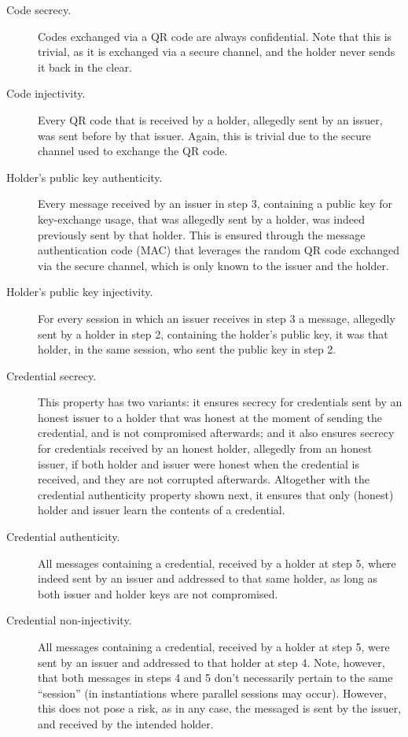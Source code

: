 \documentclass[10pt,a4paper]{article}
\begin{document}
\begin{description}
\item[Code secrecy.] Codes exchanged via a QR code are always confidential.
  Note that this is trivial, as it is exchanged via a secure channel, and
  the holder never sends it back in the clear.
\item[Code injectivity.] Every QR code that is received by a holder, allegedly
  sent by an issuer, was sent before by that issuer. Again, this is trivial due
  to the secure channel used to exchange the QR code.
\item[Holder's public key authenticity.] Every message received by an issuer
  in step 3, containing a public key for key-exchange usage, that was
  allegedly sent by a holder, was indeed previously sent by that holder.
  This is ensured through the message authentication code (MAC) that
  leverages the random QR code exchanged via the secure channel, which is
  only known to the issuer and the holder.
\item[Holder's public key injectivity.] For every session in which an
  issuer receives in step 3 a message, allegedly sent by a holder in
  step 2, containing the holder's public key, it was that holder, in
  the same session, who sent the public key in step 2.  
\item[Credential secrecy.] This property has two variants: it ensures
  secrecy for credentials sent by an honest issuer to a holder that was honest
  at the moment of sending the credential, and is not compromised afterwards;
  and it also ensures secrecy for credentials received by an honest holder,
  allegedly from an honest issuer, if both holder and issuer were honest when
  the credential is received, and they are not corrupted afterwards. Altogether
  with the credential authenticity property shown next, it ensures that only
  (honest) holder and issuer learn the contents of a credential.
\item[Credential authenticity.] All messages containing a credential, received
  by a holder at step 5, where indeed sent by an issuer and addressed to that
  same holder, as long as both issuer and holder keys are not compromised.
\item[Credential non-injectivity.] All messages containing a credential, received
  by a holder at step 5, were sent by an issuer and addressed to that holder
  at step 4. Note, however, that both messages in steps 4 and 5 don't necessarily
  pertain to the  same ``session'' (in instantiations where parallel sessions
  may occur). However, this does not pose a risk, as in any case, the messaged
  is sent by the issuer, and received by the intended holder.
\end{description}
\end{document}

